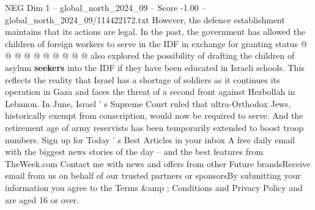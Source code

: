 \begin{textsample}{NEG Dim 1 – global\_north\_2024\_09 – Score -1.00 – global\_north\_2024\_09/114422172.txt}
However, the defence establishment maintains that its actions are legal.
In the past, the government has allowed the children of foreign workers to serve in the IDF in exchange for granting status @ @ @ @ @ @ @ @ @ @ also explored the possibility of drafting the children of asylum \textbf{seekers} into the IDF if they have been educated in Israeli schools.
This reflects the reality that Israel has a shortage of soldiers as it continues its operation in Gaza and faces the threat of a second front against Hezbollah in Lebanon.
In June, Israel ' s Supreme Court ruled that ultra-Orthodox Jews, historically exempt from conscription, would now be required to serve.
And the retirement age of army reservists has been temporarily extended to boost troop numbers.
Sign up for Today ' s Best Articles in your inbox A free daily email with the biggest news stories of the day -- and the best features from TheWeek.com Contact me with news and offers from other Future brandsReceive email from us on behalf of our trusted partners or sponsorsBy submitting your information you agree to the Terms \&amp ; Conditions and Privacy Policy and are aged 16 or over.

\end{textsample}
